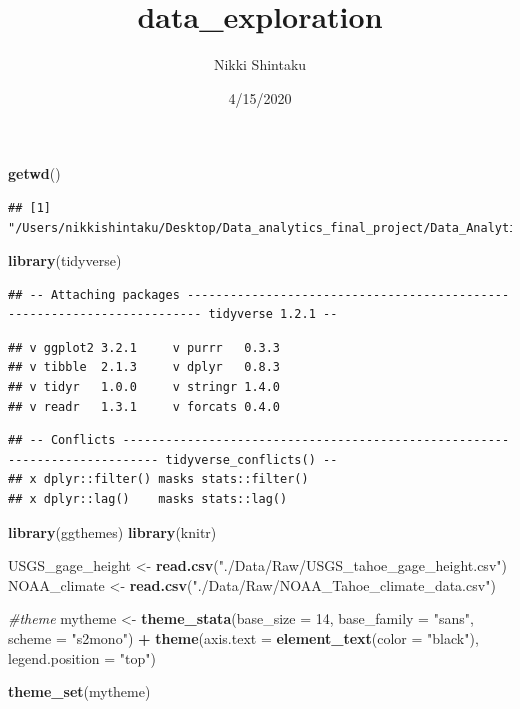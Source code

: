 \documentclass[]{article}
\title{data\_exploration}
\author{Nikki Shintaku}
\date{4/15/2020}
\newenvironment{Shaded}{\begin{snugshade}}{\end{snugshade}}
\newcommand{\CommentTok}[1]{\textcolor[rgb]{0.56,0.35,0.01}{\textit{#1}}}
\newcommand{\DataTypeTok}[1]{\textcolor[rgb]{0.13,0.29,0.53}{#1}}
\newcommand{\DecValTok}[1]{\textcolor[rgb]{0.00,0.00,0.81}{#1}}
\newcommand{\KeywordTok}[1]{\textcolor[rgb]{0.13,0.29,0.53}{\textbf{#1}}}
\newcommand{\NormalTok}[1]{#1}
\newcommand{\OperatorTok}[1]{\textcolor[rgb]{0.81,0.36,0.00}{\textbf{#1}}}
\newcommand{\StringTok}[1]{\textcolor[rgb]{0.31,0.60,0.02}{#1}}
\begin{document}
\maketitle

\begin{Shaded}
\begin{Highlighting}[]
\KeywordTok{getwd}\NormalTok{()}
\end{Highlighting}
\end{Shaded}

\begin{verbatim}
## [1] "/Users/nikkishintaku/Desktop/Data_analytics_final_project/Data_Analytics_final_project"
\end{verbatim}

\begin{Shaded}
\begin{Highlighting}[]
\KeywordTok{library}\NormalTok{(tidyverse)}
\end{Highlighting}
\end{Shaded}

\begin{verbatim}
## -- Attaching packages ------------------------------------------------------------------------ tidyverse 1.2.1 --
\end{verbatim}

\begin{verbatim}
## v ggplot2 3.2.1     v purrr   0.3.3
## v tibble  2.1.3     v dplyr   0.8.3
## v tidyr   1.0.0     v stringr 1.4.0
## v readr   1.3.1     v forcats 0.4.0
\end{verbatim}

\begin{verbatim}
## -- Conflicts --------------------------------------------------------------------------- tidyverse_conflicts() --
## x dplyr::filter() masks stats::filter()
## x dplyr::lag()    masks stats::lag()
\end{verbatim}

\begin{Shaded}
\begin{Highlighting}[]
\KeywordTok{library}\NormalTok{(ggthemes)}
\KeywordTok{library}\NormalTok{(knitr)}

\NormalTok{USGS_gage_height <-}\StringTok{ }\KeywordTok{read.csv}\NormalTok{(}\StringTok{"./Data/Raw/USGS_tahoe_gage_height.csv"}\NormalTok{)}
\NormalTok{NOAA_climate <-}\StringTok{ }\KeywordTok{read.csv}\NormalTok{(}\StringTok{"./Data/Raw/NOAA_Tahoe_climate_data.csv"}\NormalTok{)}

\CommentTok{#theme}
\NormalTok{mytheme <-}\StringTok{ }\KeywordTok{theme_stata}\NormalTok{(}\DataTypeTok{base_size =} \DecValTok{14}\NormalTok{, }\DataTypeTok{base_family =} \StringTok{"sans"}\NormalTok{, }\DataTypeTok{scheme =} \StringTok{"s2mono"}\NormalTok{) }\OperatorTok{+}
\StringTok{  }\KeywordTok{theme}\NormalTok{(}\DataTypeTok{axis.text =} \KeywordTok{element_text}\NormalTok{(}\DataTypeTok{color =} \StringTok{"black"}\NormalTok{), }
        \DataTypeTok{legend.position =} \StringTok{"top"}\NormalTok{)}

\KeywordTok{theme_set}\NormalTok{(mytheme)}
\end{Highlighting}
\end{Shaded}
\end{document}
